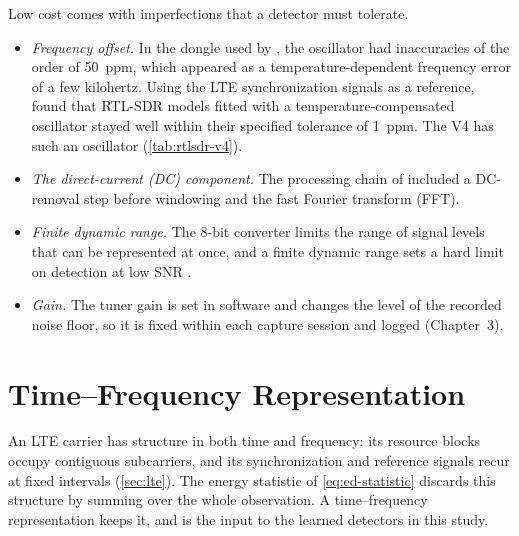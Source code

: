 Low cost comes with imperfections that a detector must tolerate.
\begin{itemize}
  \item \emph{Frequency offset.} In the dongle used by \textcite{calvopalomino2015}, the oscillator had inaccuracies of the order of \qty{50}{ppm}, which appeared as a temperature-dependent frequency error of a few kilohertz. Using the LTE synchronization signals as a reference, \textcite{calvopalomino2017} found that RTL-SDR models fitted with a temperature-compensated oscillator stayed well within their specified tolerance of \qty{1}{ppm}. The V4 has such an oscillator (\cref{tab:rtlsdr-v4}).
  \item \emph{The direct-current (DC) component.} The processing chain of \textcite{calvopalomino2015} included a DC-removal step before windowing and the fast Fourier transform (FFT).
  \item \emph{Finite dynamic range.} The 8-bit converter limits the range of signal levels that can be represented at once, and a finite dynamic range sets a hard limit on detection at low SNR \parencite{tandra2005}.
  \item \emph{Gain.} The tuner gain is set in software and changes the level of the recorded noise floor, so it is fixed within each capture session and logged (Chapter~3).
\end{itemize}

\section{Time--Frequency Representation}
\label{sec:stft}

An LTE carrier has structure in both time and frequency: its resource blocks occupy contiguous subcarriers, and its synchronization and reference signals recur at fixed intervals (\cref{sec:lte}). The energy statistic of \cref{eq:ed-statistic} discards this structure by summing over the whole observation. A time--frequency representation keeps it, and is the input to the learned detectors in this study.

